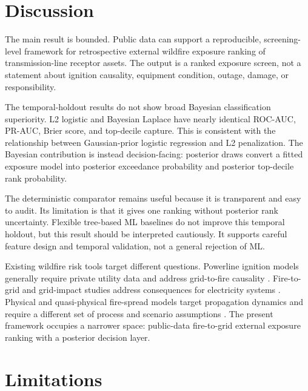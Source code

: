 \documentclass[11pt]{article}
\begin{document}
\section{Discussion}

The main result is bounded. Public data can support a reproducible,
screening-level framework for retrospective external wildfire exposure ranking
of transmission-line receptor assets. The output is a ranked exposure screen,
not a statement about ignition causality, equipment condition, outage, damage,
or responsibility.

The temporal-holdout results do not show broad Bayesian classification
superiority. L2 logistic and Bayesian Laplace have nearly identical ROC-AUC,
PR-AUC, Brier score, and top-decile capture. This is consistent with the
relationship between Gaussian-prior logistic regression and L2 penalization.
The Bayesian contribution is instead decision-facing: posterior draws convert a
fitted exposure model into posterior exceedance probability and posterior
top-decile rank probability.

The deterministic comparator remains useful because it is transparent and easy
to audit. Its limitation is that it gives one ranking without posterior rank
uncertainty. Flexible tree-based ML baselines do not improve this temporal
holdout, but this result should be interpreted cautiously. It supports careful
feature design and temporal validation, not a general rejection of ML.

Existing wildfire risk tools target different questions. Powerline ignition
models generally require private utility data and address grid-to-fire
causality \citep{yao2022electricityWildfire}. Fire-to-grid and grid-impact
studies address consequences for electricity systems
\citep{dale2018californiaGrid,panossianElgindy2023wildfire}. Physical and
quasi-physical fire-spread models target propagation dynamics and require a
different set of process and scenario assumptions \citep{sullivan2009spread}.
The present framework occupies a narrower space: public-data fire-to-grid
external exposure ranking with a posterior decision layer.

\section{Limitations}
\end{document}
